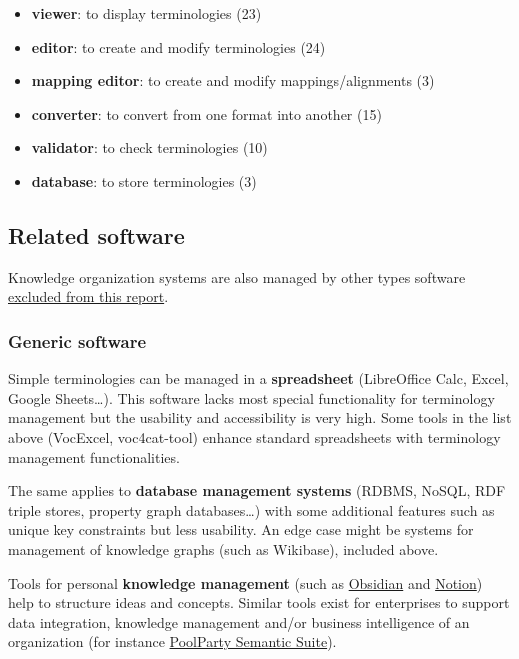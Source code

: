\documentclass[
  DIV=10]{article}
\providecommand{\tightlist}{%
  \setlength{\itemsep}{0pt}\setlength{\parskip}{0pt}}
\begin{document}
\begin{itemize}
\tightlist
\item
  \textbf{viewer}: to display terminologies (23)
\item
  \textbf{editor}: to create and modify terminologies (24)
\item
  \textbf{mapping editor}: to create and modify mappings/alignments (3)
\item
  \textbf{converter}: to convert from one format into another (15)
\item
  \textbf{validator}: to check terminologies (10)
\item
  \textbf{database}: to store terminologies (3)
\end{itemize}

\subsection{Related software}\label{related-software}

Knowledge organization systems are also managed by other types software
\hyperref[scope]{excluded from this report}.

\subsubsection{Generic software}\label{generic-software}

Simple terminologies can be managed in a \textbf{spreadsheet}
(LibreOffice Calc, Excel, Google Sheets\ldots). This software lacks most
special functionality for terminology management but the usability and
accessibility is very high. Some tools in the list above (VocExcel,
voc4cat-tool) enhance standard spreadsheets with terminology management
functionalities.

The same applies to \textbf{database management systems} (RDBMS, NoSQL,
RDF triple stores, property graph databases\ldots) with some additional
features such as unique key constraints but less usability. An edge case
might be systems for management of knowledge graphs (such as Wikibase),
included above.

Tools for personal \textbf{knowledge management} (such as
\href{https://obsidian.md/}{Obsidian} and
\href{https://www.notion.com/}{Notion}) help to structure ideas and
concepts. Similar tools exist for enterprises to support data
integration, knowledge management and/or business intelligence of an
organization (for instance
\href{https://www.poolparty.biz/product-overview}{PoolParty Semantic
Suite}).
\end{document}
